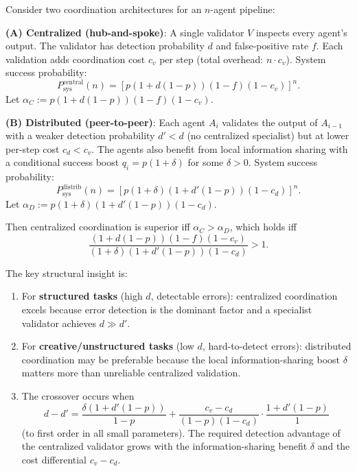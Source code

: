 \begin{theorem}
\label{thm:centralized-optimal}
Consider two coordination architectures for an $n$-agent pipeline:

\medskip\noindent\textbf{(A) Centralized (hub-and-spoke)}: A single validator $V$ inspects
every agent's output. The validator has detection probability $d$ and false-positive rate $f$.
Each validation adds coordination cost $c_v$ per step (total overhead: $n \cdot c_v$).
System success probability:
\[
  P_{\mathrm{sys}}^{\mathrm{central}}(n) = [p(1+d(1-p))(1-f)(1-c_v)]^n.
\]
Let $\alpha_C := p(1+d(1-p))(1-f)(1-c_v)$.

\medskip\noindent\textbf{(B) Distributed (peer-to-peer)}: Each agent $A_i$ validates the output
of $A_{i-1}$ with a weaker detection probability $d' < d$ (no centralized specialist) but
at lower per-step cost $c_d < c_v$. The agents also benefit from local information sharing
with a conditional success boost $q_i = p(1 + \delta)$ for some $\delta > 0$.
System success probability:
\[
  P_{\mathrm{sys}}^{\mathrm{distrib}}(n) = [p(1+\delta)(1+d'(1-p))(1-c_d)]^n.
\]
Let $\alpha_D := p(1+\delta)(1+d'(1-p))(1-c_d)$.

\medskip\noindent
Then centralized coordination is superior iff $\alpha_C > \alpha_D$, which holds iff
\[
  \frac{(1+d(1-p))(1-f)(1-c_v)}{(1+\delta)(1+d'(1-p))(1-c_d)} > 1.
\]

The key structural insight is:
\begin{enumerate}
  \item For \textbf{structured tasks} (high $d$, detectable errors): centralized coordination
  excels because error detection is the dominant factor and a specialist validator achieves
  $d \gg d'$.

  \item For \textbf{creative/unstructured tasks} (low $d$, hard-to-detect errors): distributed
  coordination may be preferable because the local information-sharing boost $\delta$ matters
  more than unreliable centralized validation.

  \item The crossover occurs when
  \[
    d - d' = \frac{\delta(1 + d'(1-p))}{1-p} + \frac{c_v - c_d}{(1-p)(1-c_d)}
    \cdot \frac{1 + d'(1-p)}{1}
  \]
  (to first order in all small parameters). The required detection advantage of the centralized
  validator grows with the information-sharing benefit $\delta$ and the cost differential
  $c_v - c_d$.
\end{enumerate}
\end{theorem}

